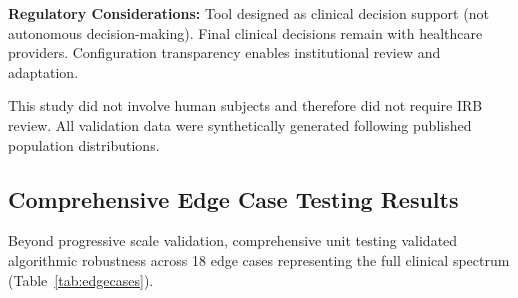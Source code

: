 \textbf{Regulatory Considerations:} Tool designed as clinical decision support (not autonomous decision-making). Final clinical decisions remain with healthcare providers. Configuration transparency enables institutional review and adaptation.

This study did not involve human subjects and therefore did not require IRB review. All validation data were synthetically generated following published population distributions.



\subsection{Comprehensive Edge Case Testing Results}

Beyond progressive scale validation, comprehensive unit testing validated algorithmic robustness across 18 edge cases representing the full clinical spectrum (Table~\ref{tab:edgecases}).

